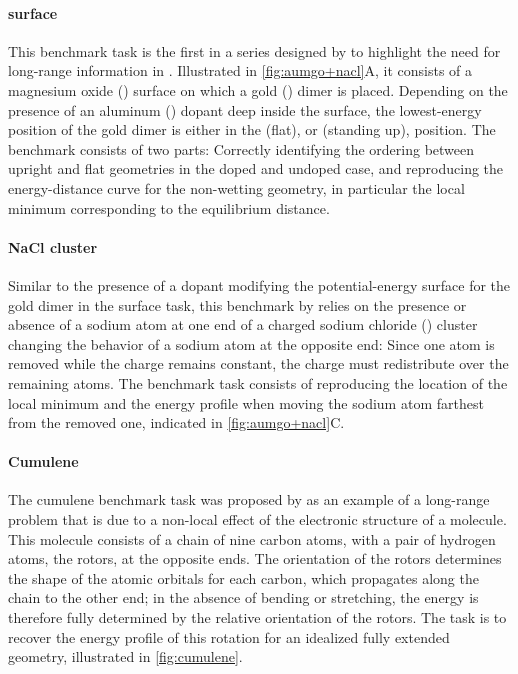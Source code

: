 \documentclass[10pt]{article}
\begin{document}
\paragraph{ surface} This benchmark task is the first in a series designed by \cite{kfgb2021} to highlight the need for long-range information in \mlps. Illustrated in \cref{fig:aumgo+nacl}A, it consists of a magnesium oxide () surface on which a gold () dimer is placed. Depending on the presence of an aluminum () dopant deep inside the surface, the lowest-energy position of the gold dimer is either in the  (flat), or  (standing up), position.
The benchmark consists of two parts: Correctly identifying the ordering between upright and flat geometries in the doped and undoped case, and reproducing the energy-distance curve for the non-wetting geometry, in particular the local minimum corresponding to the equilibrium distance.

\paragraph{NaCl cluster} Similar to the presence of a dopant modifying the potential-energy surface for the gold dimer in the  surface task, this benchmark by \cite{kfgb2021} relies on the presence or absence of a sodium atom at one end of a charged sodium chloride () cluster changing the behavior of a sodium atom at the opposite end: Since one atom is removed while the charge remains constant, the charge must redistribute over the remaining atoms.
The benchmark task consists of reproducing the location of the local minimum and the energy profile when moving the sodium atom farthest from the removed one, indicated in \cref{fig:aumgo+nacl}C.

\paragraph{Cumulene} The cumulene benchmark task was proposed by \cite{ucsgpstm2021} as an example of a long-range problem that is due to a non-local effect of the electronic structure of a molecule. This molecule consists of a chain of nine carbon atoms, with a pair of hydrogen atoms, the rotors, at the opposite ends. The orientation of the rotors determines the shape of the atomic orbitals for each carbon, which propagates along the chain to the other end; in the absence of bending or stretching, the energy is therefore fully determined by the relative orientation of the rotors. The task is to recover the energy profile of this rotation for an idealized fully extended geometry, illustrated in \cref{fig:cumulene}.
\end{document}
